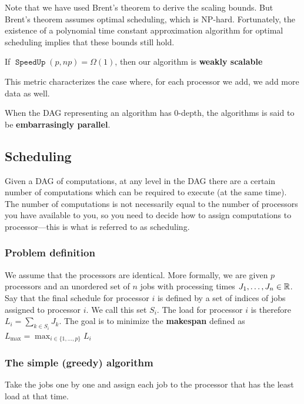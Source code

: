 \documentclass[11pt]{article}
\DeclareMathOperator{\SpeedUp}{\texttt{SpeedUp}}
\begin{document}
Note that we have used Brent's theorem to derive the scaling bounds. But Brent's theorem assumes
optimal scheduling, which is NP-hard. Fortunately, the existence of a polynomial time constant
approximation algorithm for optimal scheduling implies that these bounds still hold.

\begin{definition}
If \(\SpeedUp(p,np)=\Omega(1)\), then our algorithm is \textbf{weakly scalable}
\end{definition}

This metric characterizes the case where, for each processor we add, we add more data as well.

\begin{definition}
When the DAG representing an algorithm has 0-depth, the algorithms is said to be \textbf{embarrasingly parallel}.
\end{definition}
\subsection{Scheduling}
\label{sec:org0a58389}
Given a DAG of computations, at any level in the DAG there are a certain number of computations
which can be required to execute (at the same time). The number of computations is not necessarily
equal to the number of processors you have available to you, so you need to decide how to assign
computations to processor—this is what is referred to as scheduling.
\subsubsection{Problem definition}
\label{sec:org74a455f}
\begin{notation}[]
We assume that the processors are identical. More formally, we are given \(p\) processors and an
unordered set of \(n\) jobs with processing times \(J_1,\dots,J_n\in\mathbb{R}\). Say that the final schedule
for processor \(i\) is defined by a set of indices of jobs assigned to processor \(i\). We call
this set \(S_i\). The load for processor \(i\) is therefore \(L_i=\sum_{k\in S_i}J_k\). The goal is to
minimize the \textbf{makespan} defined as \(L_{\max}=\max_{i\in\{1,\dots,p\}}L_i\)
\end{notation}
\subsubsection{The simple (greedy) algorithm}
\label{sec:orgac7c7d1}
Take the jobs one by one and assign each job to the processor that has the least load at that time.
\end{document}
